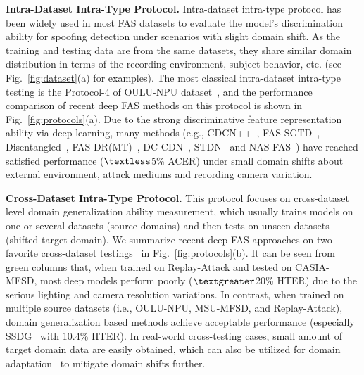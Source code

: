 \documentclass[10pt,journal,compsoc]{IEEEtran}
\begin{document}

\vspace{0.3em}

\noindent\textbf{Intra-Dataset Intra-Type Protocol.}\quad 
Intra-dataset intra-type protocol has been widely used in most FAS datasets to evaluate the model's discrimination ability for spoofing detection under scenarios with slight domain shift. As the training and testing data are from the same datasets, they share similar domain distribution in terms of the recording environment, subject behavior, etc. (see Fig.~\ref{fig:dataset}(a) for examples). The most classical intra-dataset intra-type testing is the Protocol-4 of OULU-NPU dataset~\cite{Boulkenafet2017OULU}, and the performance comparison of recent deep FAS methods on this protocol is shown in Fig.~\ref{fig:protocols}(a). Due to the strong discriminative feature representation ability via deep learning, many methods (e.g., CDCN++~\cite{yu2020searching}, FAS-SGTD~\cite{wang2020deep}, Disentangled~\cite{zhang2020face}, FAS-DR(MT)~\cite{qin2021meta}, DC-CDN~\cite{yu2021dual}, STDN~\cite{liu2020disentangling} and NAS-FAS~\cite{yu2020fas2}) have reached satisfied performance ($\textless$5\% ACER) under small domain shifts about external environment, attack mediums and recording camera variation.

\vspace{0.3em}

\noindent\textbf{Cross-Dataset Intra-Type Protocol.}\quad 
This protocol focuses on cross-dataset level domain generalization ability measurement, which usually trains models on one or several datasets (source domains) and then tests on unseen datasets (shifted target domain). We summarize recent deep FAS approaches on two favorite cross-dataset testings~\cite{yu2020searching,shao2019multi} in Fig.~\ref{fig:protocols}(b). It can be seen from green columns that, when trained on Replay-Attack and tested on CASIA-MFSD, most deep models perform poorly ($\textgreater$20\% HTER) due to the serious lighting and camera resolution variations. In contrast, when trained on multiple source datasets (i.e., OULU-NPU, MSU-MFSD, and Replay-Attack), domain generalization based methods achieve acceptable performance (especially SSDG~\cite{jia2020single} with 10.4\% HTER). In real-world cross-testing cases, small amount of target domain data are easily obtained, which can also be utilized for domain adaptation~\cite{jia2021unified} to mitigate domain shifts further. 
\end{document}
